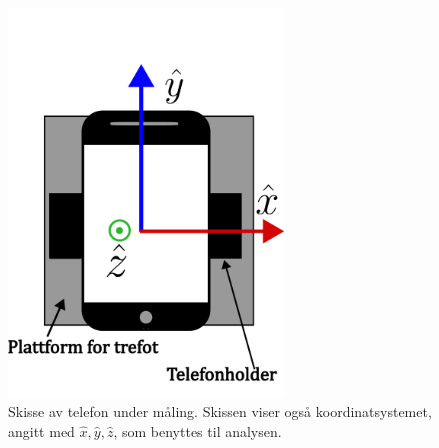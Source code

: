 \begin{figure}
    \centering
    \includegraphics[width=0.65\textwidth]{img/Plattform med telefoni.pdf}
    \caption{Skisse av telefon under måling. Skissen viser også koordinatsystemet, angitt med $\hat{x}, \hat{y}, \hat{z}$, som benyttes til analysen.}
    \label{fig:telf_akser}
\end{figure}